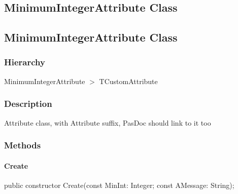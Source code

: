 \documentclass{report}
\newif\ifpdf
\begin{document}
\subsection*{\large{\textbf{MinimumIntegerAttribute Class}}\normalsize\hspace{1ex}\hrulefill}
\else
\subsection*{MinimumIntegerAttribute Class}
\fi
\label{ok_attributes.MinimumIntegerAttribute}
\subsubsection*{\large{\textbf{Hierarchy}}\normalsize\hspace{1ex}\hfill}
MinimumIntegerAttribute {$>$} TCustomAttribute
\subsubsection*{\large{\textbf{Description}}\normalsize\hspace{1ex}\hfill}
Attribute class, with Attribute suffix, PasDoc should link to it too\subsubsection*{\large{\textbf{Methods}}\normalsize\hspace{1ex}\hfill}
\paragraph*{Create}\hspace*{\fill}

\label{ok_attributes.MinimumIntegerAttribute-Create}
\begin{list}{}{
\setlength{\itemindent}{0cm}
\setlength{\listparindent}{0cm}
\setlength{\leftmargin}{\evensidemargin}
\addtolength{\leftmargin}{\tmplength}
\settowidth{\labelsep}{X}
\addtolength{\leftmargin}{\labelsep}
\setlength{\labelwidth}{\tmplength}
}
\item[\textbf{Declaration}\hfill]
\ifpdf
\begin{flushleft}
\fi
\begin{ttfamily}
public constructor Create(const MinInt: Integer; const AMessage: String);\end{ttfamily}

\ifpdf
\end{flushleft}
\fi

\end{list}
\ifpdf
\end{document}
